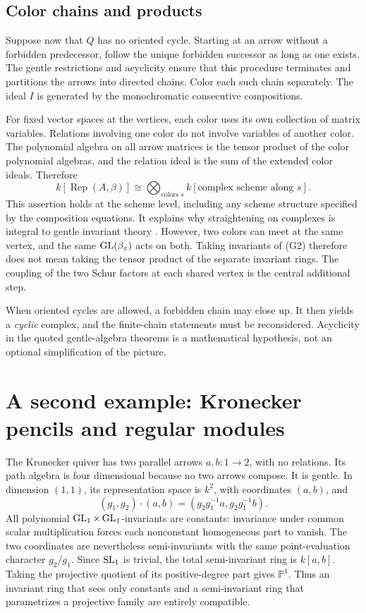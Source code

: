 \subsection{Color chains and products}
Suppose now that \(Q\) has no oriented cycle. Starting at an arrow without a forbidden predecessor, follow the unique forbidden successor as long as one exists. The gentle restrictions and acyclicity ensure that this procedure terminates and partitions the arrows into directed chains. Color each such chain separately. The ideal \(I\) is generated by the monochromatic consecutive compositions.

For fixed vector spaces at the vertices, each color uses its own collection of matrix variables. Relations involving one color do not involve variables of another color. The polynomial algebra on all arrow matrices is the tensor product of the color polynomial algebras, and the relation ideal is the sum of the extended color ideals. Therefore
\[
 k[\operatorname{Rep}(A,\beta)]
   \cong\bigotimes_{\text{colors }s}
          k[\text{complex scheme along }s].
 \tag{G2}
\]
This assertion holds at the scheme level, including any scheme structure specified by the composition equations. It explains why straightening on complexes is integral to gentle invariant theory \citep[Sections 2--5]{smtCW2011}. However, two colors can meet at the same vertex, and the same \(\operatorname{GL}(\beta_x)\) acts on both. Taking invariants of (G2) therefore does not mean taking the tensor product of the separate invariant rings. The coupling of the two Schur factors at each shared vertex is the central additional step.

When oriented cycles are allowed, a forbidden chain may close up. It then yields a \emph{cyclic} complex, and the finite-chain statements must be reconsidered. Acyclicity in the quoted gentle-algebra theorems is a mathematical hypothesis, not an optional simplification of the picture.

\section{A second example: Kronecker pencils and regular modules}
The Kronecker quiver has two parallel arrows \(a,b:1\to2\), with no relations. Its path algebra is four dimensional because no two arrows compose. It is gentle. In dimension \((1,1)\), its representation space is \(k^2\), with coordinates \((a,b)\), and
\[
 (g_1,g_2)\cdot(a,b)=(g_2g_1^{-1}a,g_2g_1^{-1}b).
\]
All polynomial \(\operatorname{GL}_1\times\operatorname{GL}_1\)-invariants are constants: invariance under common scalar multiplication forces each nonconstant homogeneous part to vanish. The two coordinates are nevertheless semi-invariants with the same point-evaluation character \(g_2/g_1\). Since \(\operatorname{SL}_1\) is trivial, the total semi-invariant ring is \(k[a,b]\). Taking the projective quotient of its positive-degree part gives \(\mathbb P^1\). Thus an invariant ring that sees only constants and a semi-invariant ring that parametrizes a projective family are entirely compatible.

